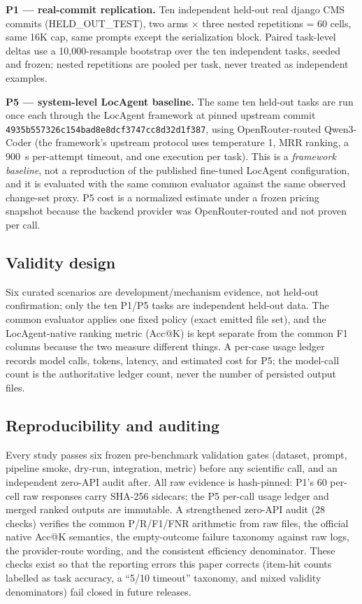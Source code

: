 \textbf{P1 — real-commit replication.} Ten independent held-out real django CMS
commits (HELD\_OUT\_TEST), two arms $\times$ three nested repetitions = 60
cells, same 16K cap, same prompts except the serialization block. Paired
task-level deltas use a 10,000-resample bootstrap over the ten independent
tasks, seeded and frozen; nested repetitions are pooled per task, never
treated as independent examples.

\textbf{P5 — system-level LocAgent baseline.} The same ten held-out tasks are
run once each through the LocAgent framework \cite{chen2025locagent} at pinned
upstream commit \texttt{4935b557326c154bad8e8dcf3747cc8d32d1f387}, using
OpenRouter-routed Qwen3-Coder (the framework's upstream protocol uses
temperature 1, MRR ranking, a 900~s per-attempt timeout, and one execution per
task). This is a \emph{framework baseline}, not a reproduction of the
published fine-tuned LocAgent configuration, and it is evaluated with the
same common evaluator against the same observed change-set proxy. P5 cost is a
normalized estimate under a frozen pricing snapshot because the backend
provider was OpenRouter-routed and not proven per call.

\subsection{Validity design}
Six curated scenarios are development/mechanism evidence, not held-out
confirmation; only the ten P1/P5 tasks are independent held-out data. The
common evaluator applies one fixed policy (exact emitted file set), and the
LocAgent-native ranking metric (Acc@K) is kept separate from the common F1
columns because the two measure different things. A per-case usage ledger
records model calls, tokens, latency, and estimated cost for P5; the model-call
count is the authoritative ledger count, never the number of persisted output
files.

\subsection{Reproducibility and auditing}
Every study passes six frozen pre-benchmark validation gates (dataset, prompt,
pipeline smoke, dry-run, integration, metric) before any scientific call, and
an independent zero-API audit after. All raw evidence is hash-pinned: P1's 60
per-cell raw responses carry SHA-256 sidecars; the P5 per-call usage ledger and
merged ranked outputs are immutable. A strengthened zero-API audit (28 checks)
verifies the common P/R/F1/FNR arithmetic from raw files, the official native
Acc@K semantics, the empty-outcome failure taxonomy against raw logs, the
provider-route wording, and the consistent efficiency denominator. These
checks exist so that the reporting errors this paper corrects (item-hit counts
labelled as task accuracy, a ``5/10 timeout'' taxonomy, and mixed validity
denominators) fail closed in future releases.

